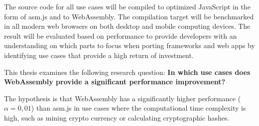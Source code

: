 The source code for all use cases will be compiled to optimized JavaScript in the form of asm.js and to WebAssembly. The compilation target will be benchmarked in all modern web browsers on both desktop and mobile computing devices. The result will be evaluated based on performance to provide developers with an understanding on which parts to focus when porting frameworks and web apps by identifying use cases that provide a high return of investment.

This thesis examines the following research question: \textbf{In which use cases does WebAssembly provide a significant performance improvement?}

The hypothesis is that WebAssembly has a significantly higher performance ($\alpha = 0,01$) than asm.js in use cases where the computational time complexity is high, such as mining crypto currency \parencite{RuthZimmermannWolsingHohlfeld2018} or calculating cryptographic hashes.
